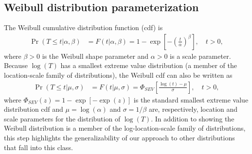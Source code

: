 \documentclass[12pt]{article}
\begin{document}
\subsection{Weibull distribution parameterization}
\label{sec:Weibull parameterization}
The Weibull cumulative
 distribution function (cdf) is
\begin{align}
\label{equation:weibull.cdf}
\Pr(T \leq t|\alpha,\beta ) &= F(t|\alpha,\beta)=1-
\exp \left [-\left (\frac{t}{\alpha} \right )^{\beta}
\right ], \quad t > 0,
\end{align}
where $\beta>0$ is the Weibull shape parameter and $\alpha>0$ is a
scale parameter. Because $\log(T)$ has a smallest extreme value
distribution (a member of the location-scale family of
distributions), the Weibull cdf can also be written as
\begin{align*}
\Pr(T \leq t| \mu,\sigma ) &= F(t| \mu,\sigma)= \Phi_{SEV}\left[\frac{\log(t)-\mu}{\sigma}\right], \quad t > 0,
\end{align*}
where $\Phi_{SEV}(z)=1-\exp[-\exp(z)]$ is the standard smallest extreme value
distribution cdf and
$\mu=\log(\alpha)$ and $\sigma=1/\beta$ are, respectively, location
and scale parameters for the distribution of $\log(T)$. In addition to showing the Weibull
distribution is a member of the log-location-scale family of
distributions, this step highlights the generalizability of our approach to other distributions 
that fall into this class.
\end{document}
